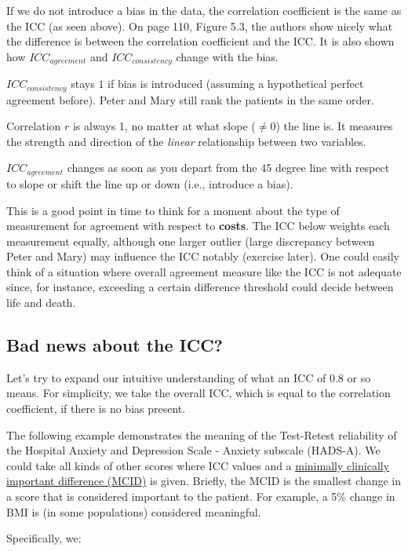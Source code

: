\documentclass[
]{book}
\begin{document}
If we do not introduce a bias in the data, the correlation coefficient
is the same as the ICC (as seen above). On page 110, Figure 5.3, the authors show nicely
what the difference is between the correlation coefficient and the ICC.
It is also shown how \(ICC_{agreement}\) and \(ICC_{consistency}\) change with the bias.

\(ICC_{consistency}\) stays \(1\) if bias is introduced (assuming a hypothetical
perfect agreement before). Peter and Mary still rank the patients
in the same order.

Correlation \(r\) is always 1, no matter at what slope (\(\ne 0\)) the line is.
It measures the strength and direction of the \emph{linear} relationship between two variables.

\(ICC_{agreement}\) changes as soon as you depart from the 45 degree line
with respect to slope or
shift the line up or down (i.e., introduce a bias).

This is a good point in time to think for a moment about the type of measurement
for agreement with respect to \textbf{costs}. The ICC below weights each measurement
equally, although one larger outlier (large discrepancy between Peter and Mary)
may influence the ICC notably (exercise later). One could easily think of a situation where
overall agreement measure like the ICC is not adequate since,
for instance, exceeding a certain
difference threshold could decide between life and death.

\subsection{Bad news about the ICC?}\label{bad-news-about-the-icc}

Let's try to expand our intuitive understanding of what an ICC of 0.8 or so means.
For simplicity, we take the overall ICC, which is equal to the correlation coefficient,
if there is no bias present.

The following example demonstrates the meaning of the Test-Retest reliability of
the Hospital Anxiety and Depression Scale - Anxiety subscale (HADS-A). We could take
all kinds of other scores where ICC values and a
\href{https://en.wikipedia.org/wiki/Minimal_important_difference}{minimally clinically important difference (MCID)}
is given. Briefly, the MCID is the smallest change in a score that is considered
important to the patient. For example, a 5\% change in BMI is (in some populations)
considered meaningful.

Specifically, we:
\end{document}

